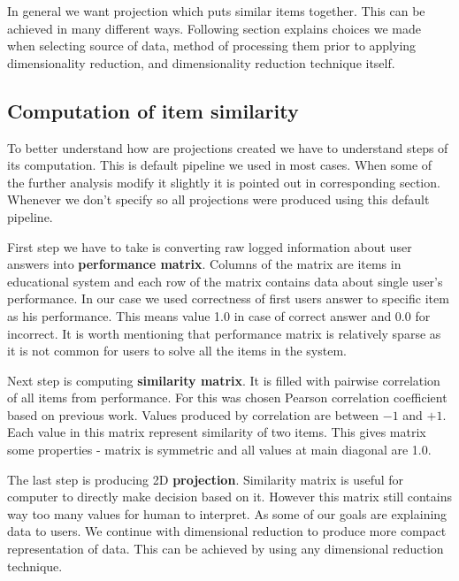 \documentclass[
  digital, %
  table,   %
  nolof,     %
  nolot,     %
  nocover
]{fithesis3}
\begin{document}

In general we want projection which puts similar items together. This can be achieved in many different ways. Following section explains choices we made when selecting source of data, method of processing them prior to applying dimensionality reduction, and dimensionality reduction technique itself.

\subsection{Computation of item similarity}\label{computation-of-item-similarity}


To better understand how are projections created we have to understand steps of its computation. This is default pipeline we used in most cases. When some of the further analysis modify it slightly it is pointed out in corresponding section. Whenever we don't specify so all projections were produced using this default pipeline.


First step we have to take is converting raw logged information about user answers into \textbf{performance matrix}. Columns of the matrix are items in educational system and each row of the matrix contains data about single user's performance. In our case we used correctness of first users answer to specific item as his performance. This means value 1.0 in case of correct answer and 0.0 for incorrect. It is worth mentioning that performance matrix is relatively sparse as it is not common for users to solve all the items in the system.


Next step is computing \textbf{similarity matrix}. It is filled with pairwise correlation of all items from performance. For this was chosen Pearson correlation coefficient based on previous work. Values produced by correlation are between $-1$ and $+1$. Each value in this matrix represent similarity of two items. This gives matrix some properties - matrix is symmetric and all values at main diagonal are 1.0.


The last step is producing 2D \textbf{projection}. Similarity matrix is useful for computer to directly make decision based on it. However this matrix still contains way too many values for human to interpret. As some of our goals are explaining data to users. We continue with dimensional reduction to produce more compact representation of data. This can be achieved by using any dimensional reduction technique.
\end{document}
